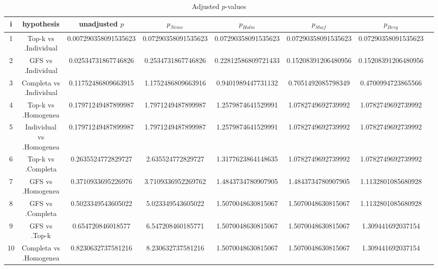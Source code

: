 \documentclass[a4paper,10pt]{article}
\begin{document}
\begin{landscape}
\begin{table}[!htp]
\centering\tiny
\caption{Adjusted $p$-values}
\begin{tabular}{cccccccc}
i&hypothesis&unadjusted $p$&$p_{Neme}$&$p_{Holm}$&$p_{Shaf}$&$p_{Berg}$\\
\hline
1&Top-k vs .Individual&0.007290358091535623&0.07290358091535623&0.07290358091535623&0.07290358091535623&0.07290358091535623\\
2&GFS vs .Individual&0.02534731867746826&0.2534731867746826&0.22812586809721433&0.15208391206480956&0.15208391206480956\\
3&Completa vs .Individual&0.11752486809663915&1.1752486809663916&0.9401989447731132&0.7051492085798349&0.4700994723865566\\
4&Top-k vs .Homogenea&0.17971249487899987&1.7971249487899987&1.2579874641529991&1.0782749692739992&1.0782749692739992\\
5&Individual vs .Homogenea&0.17971249487899987&1.7971249487899987&1.2579874641529991&1.0782749692739992&1.0782749692739992\\
6&Top-k vs .Completa&0.2635524772829727&2.635524772829727&1.3177623864148635&1.0782749692739992&1.0782749692739992\\
7&GFS vs .Homogenea&0.3710933695226976&3.7109336952269762&1.4843734780907905&1.4843734780907905&1.1132801085680928\\
8&GFS vs .Completa&0.5023349543605022&5.023349543605022&1.5070048630815067&1.5070048630815067&1.1132801085680928\\
9&GFS vs .Top-k&0.654720846018577&6.547208460185771&1.5070048630815067&1.5070048630815067&1.309441692037154\\
10&Completa vs .Homogenea&0.8230632737581216&8.230632737581216&1.5070048630815067&1.5070048630815067&1.309441692037154\\
\hline
\end{tabular}
\end{table}

\end{landscape}
\end{document}

